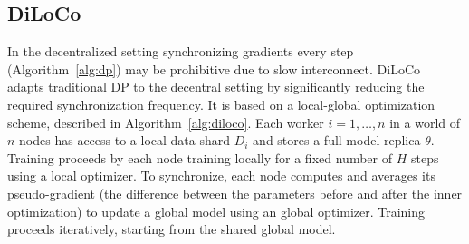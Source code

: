 \documentclass{article}
\begin{document}
% 
% 
% 

\subsection{DiLoCo}

In the decentralized setting synchronizing gradients every step
(Algorithm~\ref{alg:dp}) may be prohibitive due to slow interconnect.
DiLoCo~\cite{douillard2023diloco} adapts traditional DP to the decentral
setting by significantly reducing the required synchronization frequency. It is
based on a local-global optimization scheme, described in
Algorithm~\ref{alg:diloco}. Each worker $i=1,\dots,n$ in a world of
$n$ nodes has access to a local data shard $D_i$ and stores a full model replica
$\theta$. Training proceeds by each node training locally for a fixed number of
$H$ steps using a local optimizer. To synchronize, each node computes and
averages its pseudo-gradient (the difference between the parameters before and
after the inner optimization) to update a global model using an global
optimizer. Training proceeds iteratively, starting from the shared global model.
\end{document}
